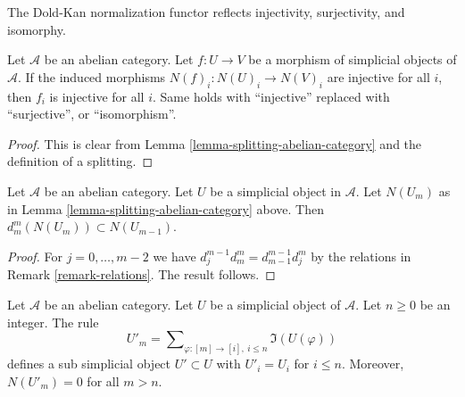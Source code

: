 \begin{lemma}
\label{lemma-injective-map-simplicial-abelian}
\begin{slogan}
The Dold-Kan normalization functor reflects
injectivity, surjectivity, and isomorphy.
\end{slogan}
Let $\mathcal{A}$ be an abelian category.
Let $f : U \to V$ be a morphism of
simplicial objects of $\mathcal{A}$.
If the induced morphisms $N(f)_i : N(U)_i \to N(V)_i$
are injective for all $i$, then $f_i$ is
injective for all $i$. Same holds with ``injective'' replaced
with ``surjective'', or ``isomorphism''.
\end{lemma}

\begin{proof}
This is clear from Lemma \ref{lemma-splitting-abelian-category}
and the definition of a splitting.
\end{proof}


\begin{lemma}
\label{lemma-N-d-in-N}
Let $\mathcal{A}$ be an abelian category.
Let $U$ be a simplicial object in $\mathcal{A}$.
Let $N(U_m)$ as in Lemma \ref{lemma-splitting-abelian-category} above.
Then $d^m_m(N(U_m)) \subset N(U_{m - 1})$.
\end{lemma}

\begin{proof}
For $j = 0, \ldots, m - 2$ we have
$d^{m - 1}_j d^m_m = d^{m - 1}_{m - 1} d^m_j$
by the relations in Remark \ref{remark-relations}.
The result follows.
\end{proof}

\begin{lemma}
\label{lemma-simplicial-abelian-n-skel-sub}
Let $\mathcal{A}$ be an abelian category.
Let $U$ be a simplicial object of $\mathcal{A}$.
Let $n \geq 0$ be an integer.
The rule
$$
U'_m = \sum\nolimits_{\varphi : [m] \to [i], \ i\leq n} \Im(U(\varphi))
$$
defines a sub simplicial object $U' \subset U$ with $U'_i = U_i$
for $i \leq n$.
Moreover, $N(U'_m) = 0$ for all $m > n$.
\end{lemma}


